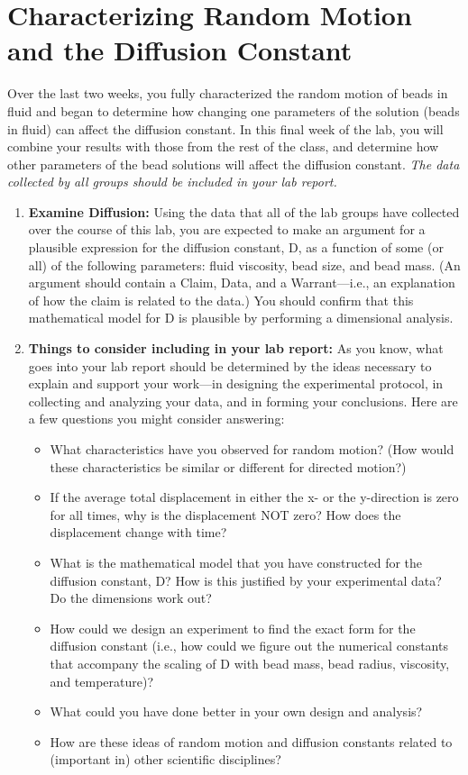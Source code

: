 \section{Characterizing Random Motion and the Diffusion Constant}
Over the last two weeks, you fully characterized the random motion of beads in fluid and began to determine how changing one parameters of the solution (beads in fluid) can affect the diffusion constant.
In this final week of the lab, you will combine your results with those from the rest of the class, and determine how other parameters of the bead solutions will affect the diffusion constant.
\emph{The data collected by all groups should be included in your lab report.}

\begin{enumerate}
\item \textbf{Examine Diffusion:} Using the data that all of the lab groups have collected over the course of this lab, you are expected to make an argument for a plausible expression for the diffusion constant, D, as a function of some (or all) of the following parameters: fluid viscosity, bead size, and bead mass. (An argument should contain a Claim, Data, and a Warrant—i.e., an explanation of how the claim is related to the data.) You should confirm that this mathematical model for D is plausible by performing a dimensional analysis.
\item \textbf{Things to consider including in your lab report:} As you know, what goes into your lab report should be determined by the ideas necessary to explain and support your work—in designing the experimental protocol, in collecting and analyzing your data, and in forming your conclusions. Here are a few questions you might consider answering:
\begin{itemize}
\item What characteristics have you observed for random motion? (How would these characteristics be similar or different for directed motion?)
\item If the average total displacement in either the x- or the y-direction is zero for all times, why is the displacement NOT zero? How does the displacement change with time?
\item What is the mathematical model that you have constructed for the diffusion constant, D? How is this justified by your experimental data? Do the dimensions work out?
\item How could we design an experiment to find the exact form for the diffusion constant (i.e., how could we figure out the numerical constants that accompany the scaling of D with bead mass, bead radius, viscosity, and temperature)?
\item What could you have done better in your own design and analysis?
\item How are these ideas of random motion and diffusion constants related to (important in) other scientific disciplines?
\end{itemize}
\end{enumerate}

